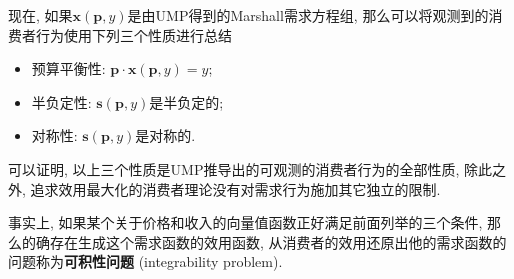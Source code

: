 \documentclass[cn, 12pt, math=mtpro2, bibstyle=apa, blue, twocol]{elegantbook}
\newcommand{\p}{\mathbf{p}}
\newcommand{\x}{\mathbf{x}}
\begin{document}
现在, 如果$\x(\p,y)$是由UMP得到的Marshall需求方程组, 那么可以将观测到的消费者行为使用下列三个性质进行总结
\begin{itemize}
  \item 预算平衡性: $\p\cdot\x(\p,y)=y$;
  \item 半负定性: $\mathbf{s}(\p,y)$是半负定的;
  \item 对称性: $\mathbf{s}(\p,y)$是对称的.
\end{itemize}
可以证明, 以上三个性质是UMP推导出的可观测的消费者行为的全部性质, 除此之外, 追求效用最大化的消费者理论没有对需求行为施加其它独立的限制.

事实上, 如果某个关于价格和收入的向量值函数正好满足前面列举的三个条件, 那么的确存在生成这个需求函数的效用函数, 从消费者的效用还原出他的需求函数的问题称为\textbf{可积性问题} (integrability problem).
\end{document}
